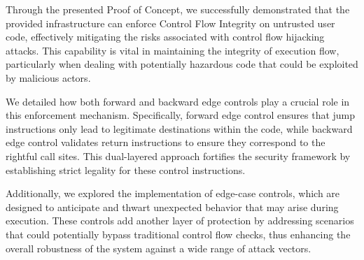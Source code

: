 Through the presented Proof of Concept, we successfully demonstrated that the
provided infrastructure can enforce Control Flow Integrity on untrusted user
code, effectively mitigating the risks associated with control flow hijacking attacks.
This capability is vital in maintaining the integrity of execution flow, particularly
when dealing with potentially hazardous code that could be exploited by malicious
actors.

We detailed how both forward and backward edge controls play a crucial role in this
enforcement mechanism. Specifically, forward edge control ensures that jump instructions
only lead to legitimate destinations within the code, while backward edge
control validates return instructions to ensure they correspond to the rightful
call sites. This dual-layered approach fortifies the security framework by establishing
strict legality for these control instructions.

Additionally, we explored the implementation of edge-case controls, which are designed
to anticipate and thwart unexpected behavior that may arise during execution.
These controls add another layer of protection by addressing scenarios that
could potentially bypass traditional control flow checks, thus enhancing the overall
robustness of the system against a wide range of attack vectors.